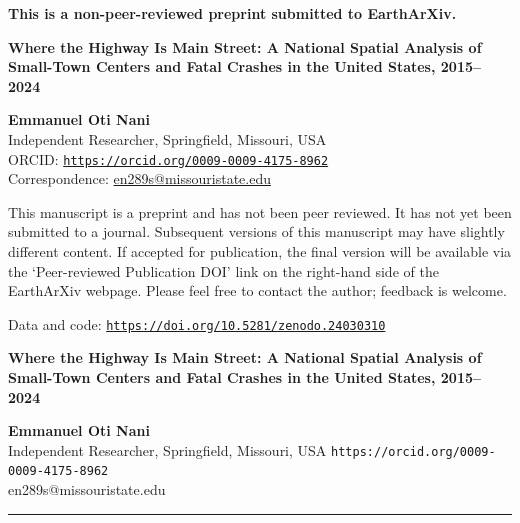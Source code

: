 \documentclass[11pt,letterpaper]{article}
\begin{document}
\thispagestyle{fancy}
\begin{center}
{\large\bfseries This is a non-peer-reviewed preprint submitted to EarthArXiv.}

\vspace{2.2em}
{\LARGE\bfseries Where the Highway Is Main Street: A National Spatial Analysis of Small-Town Centers and Fatal Crashes in the United States, 2015--2024\par}

\vspace{1.6em}
{\large\bfseries Emmanuel Oti Nani\,}\\[2pt]
Independent Researcher, Springfield, Missouri, USA\\
ORCID: \texttt{\href{https://orcid.org/0009-0009-4175-8962}{https://orcid.org/0009-0009-4175-8962}}\\
Correspondence: \href{mailto:en289s@missouristate.edu}{en289s@missouristate.edu}

\vspace{2.2em}
\begin{minipage}{0.82\textwidth}\centering
This manuscript is a preprint and has not been peer reviewed. It has not yet been submitted to a journal. Subsequent versions of this manuscript may have slightly different content. If accepted for publication, the final version will be available via the `Peer-reviewed Publication DOI' link on the right-hand side of the EarthArXiv webpage. Please feel free to contact the author; feedback is welcome.

\vspace{1.2em}
Data and code: \texttt{\href{https://doi.org/10.5281/zenodo.24030310}{https://doi.org/10.5281/zenodo.24030310}}
\end{minipage}
\end{center}
\clearpage

\linenumbers
\begin{center}
{\Large\bfseries Where the Highway Is Main Street: A National Spatial Analysis of Small-Town Centers and Fatal Crashes in the United States, 2015--2024\par}
\vspace{0.8em}
{\bfseries Emmanuel Oti Nani}\\
Independent Researcher, Springfield, Missouri, USA \textbar{} \texttt{https://orcid.org/0009-0009-4175-8962} \textbar{}\\ en289s@missouristate.edu
\end{center}
\vspace{0.4em}
\hrule
\end{document}
